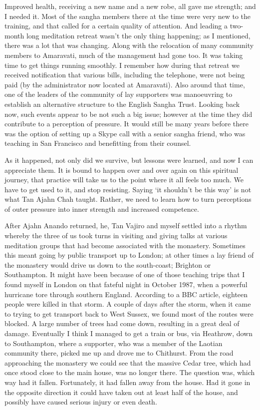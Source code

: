 Improved health, receiving a new name and a new robe, all gave me
strength; and I needed it. Most of the sangha members there at the time
were very new to the training, and that called for a certain quality of
attention. And leading a two-month long meditation retreat wasn't the
only thing happening; as I mentioned, there was a lot that was changing.
Along with the relocation of many community members to Amaravati, much
of the management had gone too. It was taking time to get things running
smoothly. I remember how during that retreat we received notification
that various bills, including the telephone, were not being paid (by the
administrator now located at Amaravati). Also around that time, one of
the leaders of the community of lay supporters was manoeuvring to
establish an alternative structure to the English Sangha Trust. Looking
back now, such events appear to be not such a big issue; however at the
time they did contribute to a perception of pressure. It would still be
many years before there was the option of setting up a Skype call with a
senior sangha friend, who was teaching in San Francisco and benefitting
from their counsel.

As it happened, not only did we survive, but lessons were learned, and
now I can appreciate them. It is bound to happen over and over again on
this spiritual journey, that practice will take us to the point where it
all feels too much. We have to get used to it, and stop resisting.
Saying `it shouldn't be this way' is not what Tan Ajahn Chah taught.
Rather, we need to learn how to turn perceptions of outer pressure into
inner strength and increased competence.

After Ajahn Anando returned, he, Tan Vajiro and myself settled into a
rhythm whereby the three of us took turns in visiting and giving talks
at various meditation groups that had become associated with the
monastery. Sometimes this meant going by public transport up to London;
at other times a lay friend of the monastery would drive us down to the
south-coast; Brighton or Southampton. It might have been because of one
of those teaching trips that I found myself in London on that fateful
night in October 1987, when a powerful hurricane tore through southern
England. According to a BBC article\cite{kent}, eighteen people were
killed in that storm. A couple
of days after the storm, when it came to trying to get transport back to
West Sussex, we found most of the routes were blocked. A large number of
trees had come down, resulting in a great deal of damage. Eventually I
think I managed to get a train or bus, via Heathrow, down to
Southampton, where a supporter, who was a member of the Laotian
community there, picked me up and drove me to Chithurst. From the road
approaching the monastery we could see that the massive Cedar tree,
which had once stood close to the main house, was no longer there. The
question was, which way had it fallen. Fortunately, it had fallen away
from the house. Had it gone in the opposite direction it could have
taken out at least half of the house, and possibly have caused serious
injury or even death.

